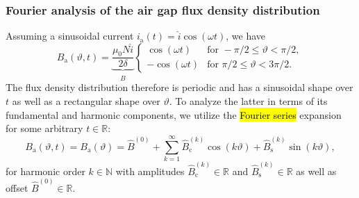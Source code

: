 \begin{frame}
	\frametitle{Fourier analysis of the air gap flux density distribution}
	Assuming a sinusoidal current $i_\mathrm{a}(t) = \hat{i} \cos(\omega t)$, we have
	\begin{equation}
		B_\mathrm{a}(\vartheta, t) = \underbrace{\frac{\mu_0 N \hat{i}}{2\delta}}_{\hat{B}} \begin{cases}
			\cos(\omega t)  & \text{for } -\pi/2 \leq \vartheta < \pi/2, \\
			-\cos(\omega t) & \text{for } \pi/2 \leq \vartheta < 3\pi/2.
		\end{cases}
		\label{eq:B_single_phase_coil}
	\end{equation}
	\pause
	The flux density distribution therefore is periodic and has a sinusoidal shape over $t$ as well as a rectangular shape over $\vartheta$. \pause To analyze the latter in terms of its fundamental and harmonic components, we utilize the \hl{Fourier series} expansion for some arbitrary $t\in\mathbb{R}$:
	\begin{equation}
		B_\mathrm{a}(\vartheta, t) =B_\mathrm{a}(\vartheta) = \hat{B}^{(0)} + \sum_{k=1}^{\infty} \hat{B}_{\mathrm{c}}^{(k)} \cos(k \vartheta) + \hat{B}_{\mathrm{s}}^{(k)} \sin(k \vartheta),
		\label{eq:fourier_series_B_single_phase_coil}
	\end{equation}
	for harmonic order $k\in\mathbb{N}$ with amplitudes $\hat{B}_{\mathrm{c}}^{(k)}\in\mathbb{R}$ and $\hat{B}_{\mathrm{s}}^{(k)}\in\mathbb{R}$ as well as offset $\hat{B}^{(0)}\in\mathbb{R}$.
\end{frame}

